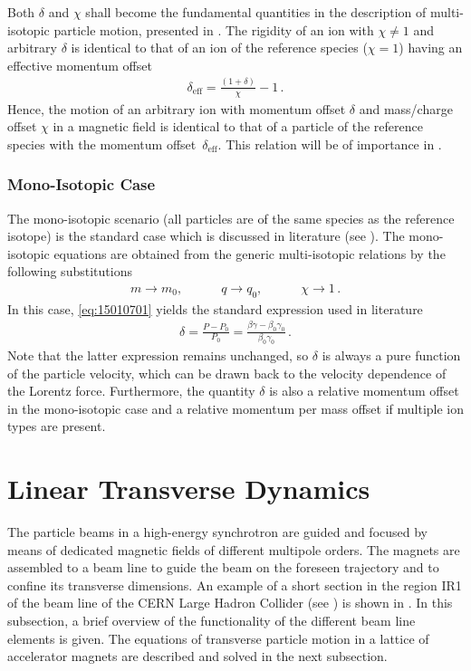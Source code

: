 Both $\delta$ and $\chi$ shall become the fundamental quantities in the description of multi-isotopic particle motion, presented in . The rigidity of an ion with $\chi \neq 1$ and arbitrary $\delta$ is identical to that of an ion of the reference species ($\chi=1$) having an effective momentum offset
%
\begin{align}
  \delta_\text{eff} = \frac{(1+\delta)}{\chi} -1 \,. \label{eq:d_effective}
\end{align}
%
Hence, the motion of an arbitrary ion  with momentum offset $\delta$ and mass/charge offset $\chi$ in a magnetic field is identical to that of a particle of the reference species with the momentum \mbox{offset $\delta_\text{eff}$}. This relation will be of importance in .
 \newpage
\subsubsection{Mono-Isotopic Case}
The mono-isotopic scenario (all particles are of the same species as the reference isotope) is the standard case which is discussed in literature (see \cite{wiedemann1999particle,lee2012accelerator}). The mono-isotopic equations are obtained from the generic multi-isotopic relations by the following substitutions
\begin{align}
m \rightarrow m_0, \quad \quad \quad q \rightarrow q_0, \quad \quad \quad  \chi \rightarrow 1\, .
\end{align}
In this case, \eqref{eq:15010701} yields the standard expression used in literature
\begin{align}
\delta = \frac{P - P_0}{P_0} = \frac{\beta \gamma - \beta_0 \gamma_0}{\beta_0 \gamma_0} \, . \label{delta:mono}
\end{align}
Note that the latter expression remains unchanged, so $\delta$ is always a pure function of the particle velocity, which can be drawn back to the velocity dependence of the Lorentz force. Furthermore, the quantity $\delta$ is also a relative momentum offset in the mono-isotopic case and a relative momentum per mass offset if multiple ion types are present.



\section{Linear Transverse Dynamics}


The particle beams in a high-energy synchrotron are guided and focused by means of dedicated magnetic fields of different multipole orders. The magnets are assembled to a beam line  to guide the beam on the foreseen trajectory and to confine its transverse dimensions. An example of a short section in the region IR1 of the beam line of the CERN Large Hadron Collider (see ) is shown in . In this subsection, a brief overview of the functionality of the different beam line elements is given. The equations of transverse particle motion in a lattice of accelerator magnets are described and solved in the next subsection.

